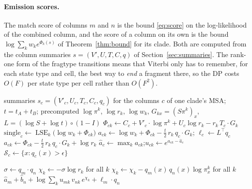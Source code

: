 \documentclass[11pt]{article}
\begin{document}
\paragraph{Emission scores.} The match score of columns $m$ and $n$ is the
bound \eqref{eq:score} on the log-likelihood of the combined column, and the
score of a column on its own is the bound $\log\sum_kw_ke^{\Phi_k(s)}$ of
Theorem~\ref{thm:bound} for its clade. Both are computed from the column
summaries $s=(V',U,T,C,q)$ of Section~\ref{sec:summaries}. The rank-one form of
the fragtype transitions means that Viterbi only has to remember, for each
state type and cell, the best way to \emph{end} a fragment there, so the DP
costs $O(F)$ per state type per cell rather than $O(F^2)$.

\begin{algorithm}[p]
\caption{Per-column preparation for one merge (outside the DP)}
\label{alg:prep}
\begin{algorithmic}[1]
\Require summaries $s_c=(V'_c,U_c,T_c,C_c,q_c)$ for the columns $c$ of one
  clade's MSA; $t=t_A+t_B$; precomputed $\log\pi^k$, $\log r_k$, $\log w_k$,
  $G_{kx}=(S\pi^k)_x$, $L=(\log S+\log t)\circ(1-I)$
    \State $\Phi_{ck}\gets C_c+V'_c\cdot\log\pi^k+U_c\log r_k-r_k\,T_c\cdot G_k$
    \State $\mathrm{single}_c\gets\operatorname{LSE}_k\big(\log w_k+\Phi_{ck}\big)$
      \State $a_{ck}\gets\log w_k+\Phi_{ck}-\tfrac t2\,r_k\,q_c\cdot G_k$;
        \quad $\ell_c\gets L^\top q_c$ 
    \Else
      \State $a_{ck}\gets\Phi_{ck}-\tfrac t2\,r_k\,q_c\cdot G_k+\log r_k$
    \EndIf
    \State $\hat a_c\gets\max_ka_{ck}$;\quad $u_{ck}\gets e^{a_{ck}-\hat a_c}$
    \State $\mathcal S_c\gets\{x:q_c(x)>\epsilon\}$ 
  \EndFor
\EndFunction
\end{algorithmic}
\end{algorithm}

\begin{algorithm}[p]
\caption{Match score of column $m$ of $A$ and column $n$ of $B$ (inside the DP)}
\label{alg:pair}
\begin{algorithmic}[1]
  \State $\sigma\gets q_m\cdot q_n$ 
  \State $\chi_k\gets-\sigma\log r_k$ for all $k$ 
   
    \State $\chi_k\gets\chi_k-q_m(x)\,q_n(x)\log\pi^k_x$ for all $k$
  \EndFor
  \State \Return $\hat a_m+\hat b_n+\log\sum_ku_{mk}\,v_{nk}\,e^{\chi_k}+\ell_m\cdot q_n$
\EndFunction
\end{algorithmic}
\end{algorithm}
\end{document}
